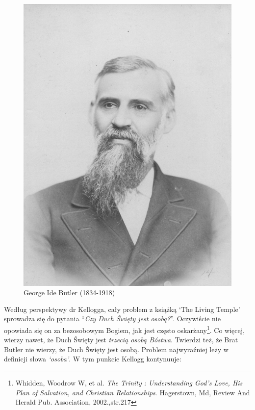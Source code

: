 \begin{figure}[hp]
    \centering
    \includegraphics[width=1\linewidth]{images/george-ide-butler.jpg}
    \caption*{George Ide Butler (1834-1918)}
    \label{fig:g-i-butler}
\end{figure}

Według perspektywy dr Kellogga, cały problem z książką ‘The Living Temple’ sprowadza się do pytania “\textit{Czy Duch Święty jest osobą?}”. Oczywiście nie opowiada się on za bezosobowym Bogiem, jak jest często oskarżany\footnote{Whidden, Woodrow W, et al. \textit{The Trinity : Understanding God's Love, His Plan of Salvation, and Christian Relationships}. Hagerstown, Md, Review And Herald Pub. Association, 2002.,str.217}. Co więcej, wierzy nawet, że Duch Święty jest \textit{trzecią osobą Bóstwa}. Twierdzi też, że Brat Butler nie wierzy, że Duch Święty jest osobą. Problem najwyraźniej leży w definicji słowa \textit{‘osoba’}. W tym punkcie Kellogg kontynuuje:

